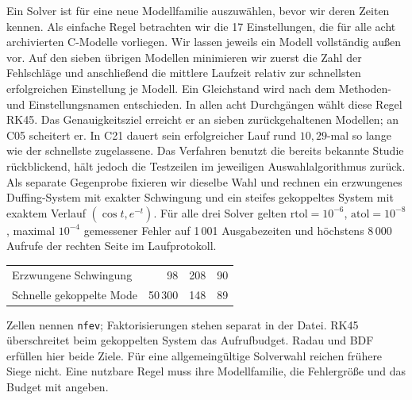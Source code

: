 Ein Solver ist für eine neue Modellfamilie auszuwählen, bevor wir deren Zeiten kennen. Als einfache Regel betrachten wir die 17 Einstellungen, die für alle acht archivierten C-Modelle vorliegen. Wir lassen jeweils ein Modell vollständig außen vor. Auf den sieben übrigen Modellen minimieren wir zuerst die Zahl der Fehlschläge und anschließend die mittlere Laufzeit relativ zur schnellsten erfolgreichen Einstellung je Modell. Ein Gleichstand wird nach dem Methoden- und Einstellungsnamen entschieden.
In allen acht Durchgängen wählt diese Regel RK45. Das Genauigkeitsziel erreicht er an sieben zurückgehaltenen Modellen; an C05 scheitert er. In C21 dauert sein erfolgreicher Lauf rund \(10{,}29\)-mal so lange wie der schnellste zugelassene. Das Verfahren benutzt die bereits bekannte Studie rückblickend, hält jedoch die Testzeilen im jeweiligen Auswahlalgorithmus zurück.
Als separate Gegenprobe fixieren wir dieselbe Wahl und rechnen ein erzwungenes Duffing-System mit exakter Schwingung und ein steifes gekoppeltes System mit exaktem Verlauf \((\cos t,e^{-t})\). Für alle drei Solver gelten \(\mathrm{rtol}=10^{-6}\), \(\mathrm{atol}=10^{-8}\), maximal \(10^{-4}\) gemessener Fehler auf 1\,001 Ausgabezeiten und höchstens 8\,000 Aufrufe der rechten Seite im Laufprotokoll.
{\tblstart\begin{tabularx}{\linewidth}{@{}Yrrr@{}}\toprule
{}&&&\\\midrule
Erzwungene Schwingung&98&208&90\\
Schnelle gekoppelte Mode&50\,300&148&89\\\bottomrule\end{tabularx}\par}
Zellen nennen \texttt{nfev}; Faktorisierungen stehen separat in der Datei. RK45 überschreitet beim gekoppelten System das Aufrufbudget. Radau und BDF erfüllen hier beide Ziele. Für eine allgemeingültige Solverwahl reichen frühere Siege nicht. Eine nutzbare Regel muss ihre Modellfamilie, die Fehlergröße und das Budget mit angeben.


